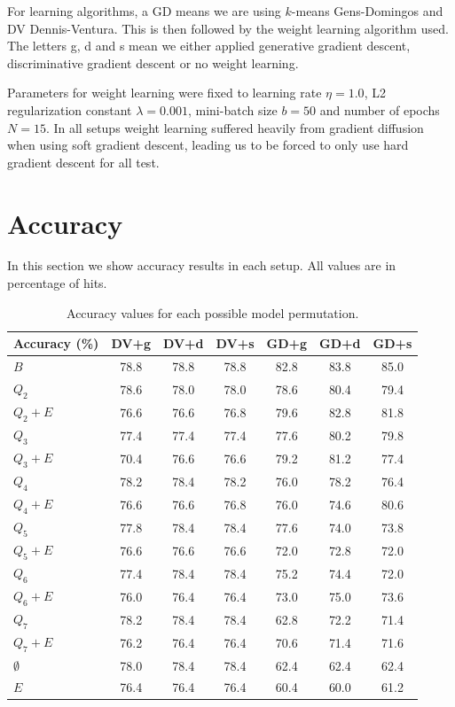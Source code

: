 For learning algorithms, a GD means we are using $k$-means Gens-Domingos and DV Dennis-Ventura.
This is then followed by the weight learning algorithm used. The letters g, d and s mean we either
applied generative gradient descent, discriminative gradient descent or no weight learning.

Parameters for weight learning were fixed to learning rate $\eta=1.0$, L2 regularization constant
$\lambda=0.001$, mini-batch size $b=50$ and number of epochs $N=15$. In all setups weight learning
suffered heavily from gradient diffusion when using soft gradient descent, leading us to be forced
to only use hard gradient descent for all test.

\section{Accuracy}

In this section we show accuracy results in each setup. All values are in percentage of hits.

\begin{table}[h]
  \centering
  \begin{tabular}{l|c|c|c|c|c|c}
    \hline
    \multicolumn{1}{c}{\bfseries Accuracy (\%)} & \multicolumn{1}{c}{\bfseries DV+g} &
    \multicolumn{1}{c}{\bfseries DV+d} & \multicolumn{1}{c}{\bfseries DV+s} &
    \multicolumn{1}{c}{\bfseries GD+g} & \multicolumn{1}{c}{\bfseries GD+d} &
    \multicolumn{1}{c}{\bfseries GD+s}\\
    \hline
    $B$         & 78.8 & 78.8 & 78.8 & 82.8 & 83.8 & 85.0\\
    $Q_2$       & 78.6 & 78.0 & 78.0 & 78.6 & 80.4 & 79.4\\
    $Q_2+E$     & 76.6 & 76.6 & 76.8 & 79.6 & 82.8 & 81.8\\
    $Q_3$       & 77.4 & 77.4 & 77.4 & 77.6 & 80.2 & 79.8\\
    $Q_3+E$     & 70.4 & 76.6 & 76.6 & 79.2 & 81.2 & 77.4\\
    $Q_4$       & 78.2 & 78.4 & 78.2 & 76.0 & 78.2 & 76.4\\
    $Q_4+E$     & 76.6 & 76.6 & 76.8 & 76.0 & 74.6 & 80.6\\
    $Q_5$       & 77.8 & 78.4 & 78.4 & 77.6 & 74.0 & 73.8\\
    $Q_5+E$     & 76.6 & 76.6 & 76.6 & 72.0 & 72.8 & 72.0\\
    $Q_6$       & 77.4 & 78.4 & 78.4 & 75.2 & 74.4 & 72.0\\
    $Q_6+E$     & 76.0 & 76.4 & 76.4 & 73.0 & 75.0 & 73.6\\
    $Q_7$       & 78.2 & 78.4 & 78.4 & 62.8 & 72.2 & 71.4\\
    $Q_7+E$     & 76.2 & 76.4 & 76.4 & 70.6 & 71.4 & 71.6\\
    $\emptyset$ & 78.0 & 78.4 & 78.4 & 62.4 & 62.4 & 62.4\\
    $E$         & 76.4 & 76.4 & 76.4 & 60.4 & 60.0 & 61.2\\
  \end{tabular}
  \caption{Accuracy values for each possible model permutation.\label{tab:accuracy}}
\end{table}

